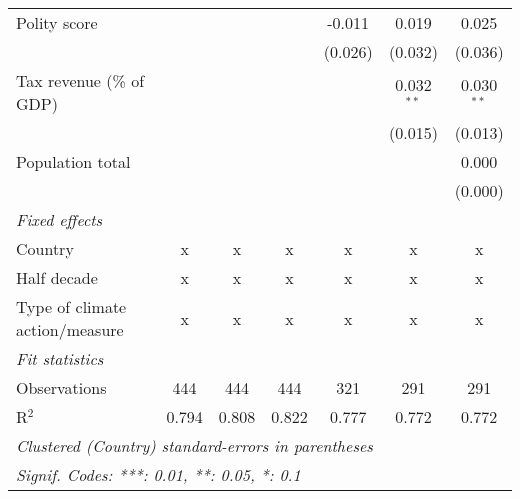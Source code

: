 \begin{tabular}{lcccccc}
   Polity score                                         &              &                &                & -0.011         & 0.019          & 0.025\\   
                                                        &              &                &                & (0.026)        & (0.032)        & (0.036)\\   
   Tax revenue (\% of GDP)                              &              &                &                &                & 0.032$^{**}$   & 0.030$^{**}$\\   
                                                        &              &                &                &                & (0.015)        & (0.013)\\   
   Population total                                     &              &                &                &                &                & 0.000\\   
                                                        &              &                &                &                &                & (0.000)\\   
   \emph{Fixed effects}\\
   Country                                              & x            & x              & x              & x              & x              & x\\  
   Half decade                                          & x            & x              & x              & x              & x              & x\\  
   Type of climate action/measure                       & x            & x              & x              & x              & x              & x\\  
   \midrule \emph{Fit statistics}\\
   Observations                                         & 444          & 444            & 444            & 321            & 291            & 291\\  
   R$^2$                                                & 0.794        & 0.808          & 0.822          & 0.777          & 0.772          & 0.772\\  
   \midrule
   \multicolumn{7}{l}{\emph{Clustered (Country) standard-errors in parentheses}}\\
   \multicolumn{7}{l}{\emph{Signif. Codes: ***: 0.01, **: 0.05, *: 0.1}}\\
\end{tabular}
\par\endgroup


